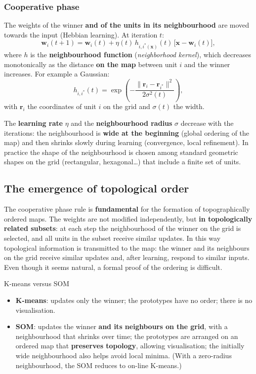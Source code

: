 \subsubsection{Cooperative phase}\label{fase-cooperativa}

The weights of the winner \textbf{and of the units in its
neighbourhood} are moved towards the input (Hebbian learning). At
iteration \(t\): \[
\mathbf{w}_i(t+1) = \mathbf{w}_i(t) + \eta(t)\,h_{i,i^*(\mathbf{x})}(t)\,\big[\mathbf{x} - \mathbf{w}_i(t)\big],
\] where \(h\) is the \textbf{neighbourhood function}
(\emph{neighborhood kernel}), which decreases monotonically as the
distance \textbf{on the map} between unit \(i\) and the winner
increases. For example a Gaussian: \[
h_{i,i^*}(t) = \exp\left(-\frac{\|\mathbf{r}_i - \mathbf{r}_{i^*}\|^2}{2\sigma^2(t)}\right),
\] with \(\mathbf{r}_i\) the coordinates of unit \(i\) on the grid and
\(\sigma(t)\) the width.

The \textbf{learning rate} \(\eta\) and the \textbf{neighbourhood
radius} \(\sigma\) decrease with the iterations: the neighbourhood is
\textbf{wide at the beginning} (global ordering of the map) and then
shrinks slowly during learning (convergence, local refinement). In
practice the shape of the neighbourhood is chosen among standard
geometric shapes on the grid (rectangular, hexagonal\ldots) that
include a finite set of units.

\subsection{The emergence of topological
order}\label{lemergere-dellordine-topologico}

The cooperative phase rule is \textbf{fundamental} for the formation of
topographically ordered maps. The weights are not modified
independently, but \textbf{in topologically related subsets}: at each
step the neighbourhood of the winner on the grid is selected, and all
units in the subset receive similar updates. In this way topological
information is transmitted to the map: the winner and its neighbours on
the grid receive similar updates and, after learning, respond to
similar inputs. Even though it seems natural, a formal proof of the
ordering is difficult.

\begin{boxtip}{K-means versus SOM}

\begin{itemize}
\tightlist
\item
  \textbf{K-means}: updates only the winner; the prototypes have no
  order; there is no visualisation.
\item
  \textbf{SOM}: updates the winner \textbf{and its neighbours on the
  grid}, with a neighbourhood that shrinks over time; the prototypes are
  arranged on an ordered map that \textbf{preserves topology}, allowing
  visualisation; the initially wide neighbourhood also helps avoid local
  minima. (With a zero-radius neighbourhood, the SOM reduces to on-line
  K-means.)
\end{itemize}

\end{boxtip}

